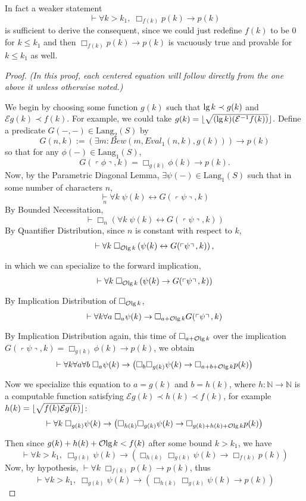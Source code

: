 \documentclass[onecolumn,authordate]{miri-tech-article}
\DeclarePairedDelimiter\floor{\lfloor}{\rfloor}
\numberwithin{equation}{section}
\newcommand{\eqn}[1]{\begin{equation}#1\end{equation}}
\theoremstyle{definition}
\newcommand{\NN}{\mathbb{N}}
\newcommand{\Ee}{\mathcal{E}}
\newcommand{\Oo}{\mathcal{O}}
\newcommand{\proves}[1]{\underset{#1}{\vdash}}
\newcommand{\bx}[1]{\Box_{#1}}
\newcommand{\Lang}{\mathrm{Lang}}
\renewcommand{\implies}{\rightarrow}
\renewcommand{\to}{\rightarrow}
\renewcommand{\iff}{\leftrightarrow}
\newcommand{\qquote}[1]{\left\ulcorner #1 \right\urcorner}
\renewcommand{\lg}{\mathrm{lg\hspace{0.3ex}}}
\renewcommand{\-}{^{-1}}
\begin{document}
 In fact a weaker statement
$$\proves{} \forall k>k_1,\; \bx{f(k)}p(k) \implies p(k)$$
is sufficient to derive the consequent, since we could just redefine $f(k)$ to be $0$ for $k\leq k_1$ and then $\bx{f(k)}p(k) \implies p(k)$ is vacuously true and provable for $k \leq k_1$ as well.

\begin{proof}
{\em (In this proof, each centered equation will follow directly from the one above it unless otherwise noted.)}

We begin by choosing some function $g(k)$ such that $\lg k \prec g(k)$ and $\Ee g(k) \prec f(k)$.  For example, we could take $g(k) = \floor{\sqrt{(\lg k)(\Ee\- f(k))}}$.  Define a predicate $G(-,-)\in\Lang_2(S)$ by
$$G(n,k) := \left(\exists m : Bew(m,Eval_1(n,k),g(k))\right) \implies p(k)$$
so that for any $\phi(-)\in\Lang_1(S)$,
%
$$G(\qquote\phi,k) = \bx{g(k)}\phi(k) \implies p(k).$$
%
Now, by the Parametric Diagonal Lemma, $\exists \psi(-)\in\Lang_1(S)$ such that in some number of characters $n$,
\eqn{\label{eqn1}
\proves{n} \forall k \; \psi(k) \iff G(\qquote\psi,k)
}
By Bounded Necessitation,
$$\proves{} \bx{n} \left(\forall k \; \psi(k) \iff G(\qquote\psi,k)\right)$$
By Quantifier Distribution, since $n$ is constant with respect to $k$,
$$\proves{} \forall k \; \bx{\Oo\lg k} \left(\psi(k) \iff G(\qquote\psi,k)\right),$$
in which we can specialize to the forward implication,
$$\proves{} \forall k \; \bx{\Oo\lg k} \left(\psi(k) \implies G(\qquote\psi,k)\right)$$
By Implication Distribution of $\bx{\Oo\lg k}$,
$$\proves{} \forall k \forall a \; \bx{a}\psi(k) \implies \bx{a+\Oo\lg k}G(\qquote\psi,k)$$
By Implication Distribution again, this time of $\bx{a+\Oo\lg k}$ over the implication $G(\qquote\psi,k) = \bx{g(k)}\phi(k) \implies p(k)$, we obtain
$$\proves{} \forall k \forall a \forall b \; \bx{a}\psi(k) \implies 
\left(\bx{b}\bx{g(k)}\psi(k) \implies \bx{a+b+\Oo\lg k}p(k)\right)$$
Now we specialize this equation to $a=g(k)$ and $b=h(k)$, where $h:\NN\to\NN$ is a computable function satisfying $\Ee g(k)\prec h(k)\prec f(k)$, for example $h(k) = \floor{\sqrt{f(k)\Ee g(k)}}$:
$$\proves{} \forall k \; \bx{g(k)} \psi(k) \implies 
\left(\bx{h(k)}\bx{g(k)}\psi(k) \implies \bx{g(k)+h(k)+\Oo\lg k} p(k)\right)$$
Then since $g(k)+h(k)+\Oo\lg k < f(k)$ after some bound $k > k_1$, we have
$$\proves{} \forall k>k_1, \; \bx{g(k)}\psi(k) \implies \left(\bx{h(k)}\bx{g(k)}\psi(k) \implies \bx{f(k)} p(k)\right)$$
Now, by hypothesis, $\proves{} \forall k\; \bx{f(k)}p(k)\implies p(k)$, thus
\eqn{\label{eqn9}
\proves{} \forall k>k_1, \; \bx{g(k)}\psi(k) \implies \left(\bx{h(k)}\bx{g(k)}\psi(k) \implies p(k)\right)
}
\end{proof}
\end{document}
